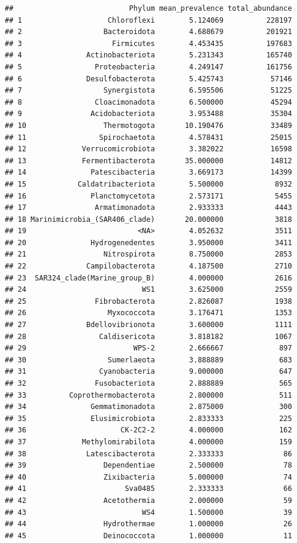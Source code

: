 \documentclass[
]{book}
\begin{document}
\begin{verbatim}
##                           Phylum mean_prevalence total_abundance
## 1                    Chloroflexi        5.124069          228197
## 2                   Bacteroidota        4.688679          201921
## 3                     Firmicutes        4.453435          197683
## 4               Actinobacteriota        5.231343          165740
## 5                 Proteobacteria        4.249147          161756
## 6               Desulfobacterota        5.425743           57146
## 7                   Synergistota        6.595506           51225
## 8                 Cloacimonadota        6.500000           45294
## 9                Acidobacteriota        3.953488           35304
## 10                  Thermotogota       10.190476           33489
## 11                 Spirochaetota        4.578431           25015
## 12             Verrucomicrobiota        3.382022           16598
## 13             Fermentibacterota       35.000000           14812
## 14               Patescibacteria        3.669173           14399
## 15            Caldatribacteriota        5.500000            8932
## 16               Planctomycetota        2.573171            5455
## 17                Armatimonadota        2.933333            4443
## 18 Marinimicrobia_(SAR406_clade)       20.000000            3818
## 19                          <NA>        4.052632            3511
## 20               Hydrogenedentes        3.950000            3411
## 21                  Nitrospirota        8.750000            2853
## 22              Campilobacterota        4.187500            2710
## 23  SAR324_clade(Marine_group_B)        4.000000            2616
## 24                           WS1        3.625000            2559
## 25                Fibrobacterota        2.826087            1938
## 26                   Myxococcota        3.176471            1353
## 27              Bdellovibrionota        3.600000            1111
## 28                 Caldisericota        3.818182            1067
## 29                         WPS-2        2.666667             897
## 30                   Sumerlaeota        3.888889             683
## 31                 Cyanobacteria        9.000000             647
## 32                Fusobacteriota        2.888889             565
## 33          Coprothermobacterota        2.800000             511
## 34               Gemmatimonadota        2.875000             300
## 35               Elusimicrobiota        2.833333             225
## 36                      CK-2C2-2        4.000000             162
## 37             Methylomirabilota        4.000000             159
## 38              Latescibacterota        2.333333              86
## 39                  Dependentiae        2.500000              78
## 40                  Zixibacteria        5.000000              74
## 41                       Sva0485        2.333333              66
## 42                  Acetothermia        2.000000              59
## 43                           WS4        1.500000              39
## 44                  Hydrothermae        1.000000              26
## 45                  Deinococcota        1.000000              11
\end{verbatim}
\end{document}
